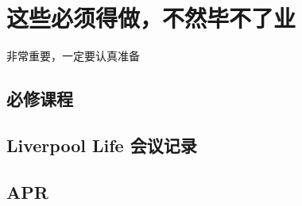 \chapter{这些必须得做，不然毕不了业}
\label{must-do}

非常重要，一定要认真准备

\section{必修课程}

\section{Liverpool Life 会议记录}

\section{APR}

